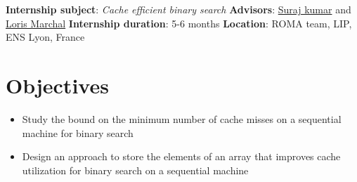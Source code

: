 \documentclass[11pt,a4]{article}
\begin{document}

\medskip
\medskip
\vspace*{0.35cm}
\noindent\textbf{Internship subject}: \emph{Cache efficient binary search}\newline
\textbf{Advisors}: \href{https://surakuma.github.io}{Suraj kumar} and \href{https://perso.ens-lyon.fr/loris.marchal}{ Loris Marchal}\newline
\textbf{Internship duration}: 5-6 months \newline
\textbf{Location}: ROMA team, LIP, ENS Lyon, France

\section*{Objectives}
\begin{itemize}
	\item[$\bullet$] Study the bound on the minimum number of cache misses on a sequential machine for binary search
	\item[$\bullet$] Design an approach to store the elements of an array that improves cache utilization for binary search on a sequential machine
\end{itemize}
\end{document}
